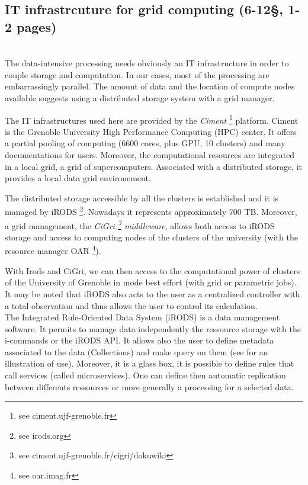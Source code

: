\documentclass[a4paper, 10pt]{article}
\begin{document}
\newpage
\begin{multicols}{2}



\section{IT infrastrcuture for grid computing (6-12\S , 1-2 pages) }
~\\


The data-intensive processing
needs obviously an IT infrastructure in order to couple storage and computation.
In our cases, most of the processing are embarrassingly parallel.
The amount of data and the location of compute nodes available suggests using a 
distributed storage system with a grid manager.


The IT infrastructures used here are provided by the \emph{Ciment} \footnote{see ciment.ujf-grenoble.fr} 
platform. Ciment is the Grenoble University High Performance Computing (HPC) center. It offers a partial pooling of computing 
(6600 cores, plus GPU, 10 clusters) and many documentations for users. 
Moreover, the computational resources are integrated in a local grid, a grid of supercomputers. Associated with a distributed storage,
it provides a local data grid environement.

The distributed storage accessible by all the clusters is established and it is managed by iRODS \footnote{see irods.org}.
Nowadays it represents approximately 700 TB. Moreover, a grid management, the \emph{CiGri 
\footnote{see ciment.ujf-grenoble.fr/cigri/dokuwiki} middleware}, allows both access to iRODS storage and access 
to computing nodes of the clusters of the university (with the resource manager OAR \footnote{see oar.imag.fr}).


With Irods and CiGri, we can then access to the computational power of clusters of the University of Grenoble 
in mode best effort (with grid or parametric jobs). It may be noted that iRODS also acts to the user as a centralized controller with a 
total observation and thus allows the user to control its calculation.
~\\


The Integrated Rule-Oriented Data System (iRODS) is a data management software.
It permits to manage data independently the ressource storage with the i-commands or the iRODS API. 
It allows also the user to define metadata associated to the data (Collections) and make query on them
(see \cite{key:CCQSC} for an illustration of use). 
Moreover, it is a glass box, it is possible to define rules that call services (called microservices). One can define then automatic 
replication between differents ressources or more generally a processing for a selected data. 




\end{multicols}
\end{document}

